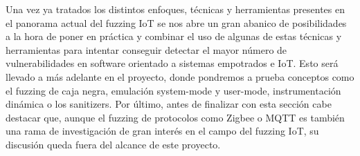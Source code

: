 Una vez ya tratados los distintos enfoques, técnicas y herramientas presentes en el panorama actual del fuzzing IoT se nos abre un gran abanico de 
posibilidades a la hora de poner en práctica y combinar el uso de algunas de estas técnicas y herramientas para intentar conseguir detectar el mayor 
número de vulnerabilidades en software orientado a sistemas empotrados e IoT. Esto será llevado a más adelante en el proyecto, donde pondremos a prueba 
conceptos como el fuzzing de caja negra, emulación system-mode y user-mode, instrumentación dinámica o los sanitizers. Por último, antes de finalizar con
esta sección cabe destacar que, aunque el fuzzing de protocolos como Zigbee o MQTT es también una rama de investigación de gran interés en el campo del
fuzzing IoT, su discusión queda fuera del alcance de este proyecto.


